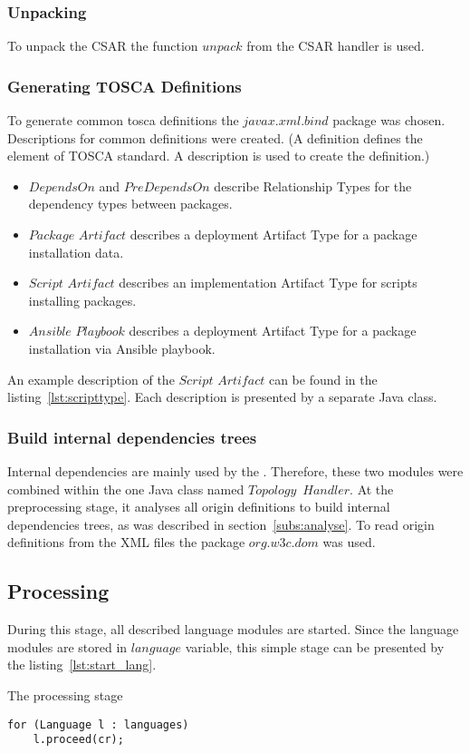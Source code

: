 \subsubsection*{Unpacking}
To unpack the CSAR the function $unpack$ from the CSAR handler is used.

\subsubsection*{Generating TOSCA Definitions}
To generate common \gls{tosca} definitions the $javax$.$xml$.$bind$ package was chosen. 
Descriptions for common definitions were created. (A definition defines the element of TOSCA standard. A description is used to create the definition.)
\begin{itemize}
	\item $DependsOn$ and $PreDependsOn$ describe Relationship Types %
	 for the dependency types between packages.%
	\item $Package$ $Artifact$ describes a deployment Artifact Type for a package installation data.
	\item $Script$ $Artifact$ describes an implementation Artifact Type for scripts installing packages.
	\item $Ansible$ $Playbook$ describes a deployment Artifact Type for a package installation via Ansible playbook.
\end{itemize}
An example description of the $Script$ $Artifact$ can be found in the listing~\ref{lst:scripttype}.
Each description is presented by a separate Java class.

\subsubsection*{Build internal dependencies trees}\label{subs:imp_findintref}
Internal dependencies are mainly used by the .
Therefore, these two modules were combined within the one Java class named $Topology$~$Handler$.	
At the preprocessing stage, it analyses all origin definitions to build internal dependencies trees, as was described in section~\ref{subs:analyse}.
To read origin definitions from the XML files the package $org$.$w3c$.$dom$ was used.

\subsection*{Processing}
During this stage, all described language modules are started.
Since the language modules are stored in $language$ variable, this simple stage can be presented by the listing~\ref{lst:start_lang}.
\begin{Listing}
\caption{The processing stage}
\label{lst:start_lang}
\begin{lstlisting}
for (Language l : languages)
	l.proceed(cr);
\end{lstlisting}
\end{Listing}


